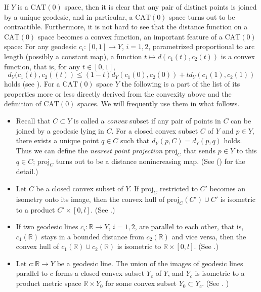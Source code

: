 \documentclass[12pt]{amsart}
\numberwithin{equation}{section}
\theoremstyle{plain}
\theoremstyle{definition}
\theoremstyle{remark}
\newcommand{\R}{{\mathbb R}}
\newcommand{\nrprj}{\mathrm{proj}}
\newcommand{\cat}[1]{\mathrm{CAT}(#1)}
\begin{document}
%
%
If $Y$ is a $\cat{0}$ space, then it is clear that any pair of distinct
points is joined by a unique geodesic, and in particular, a $\cat{0}$
space turns out to be contractible. 
Furthermore, it is not hard to see that the distance function on a
$\cat{0}$ space becomes a convex function, an important feature of a
$\cat{0}$ space: 
For any geodesic $c_i\colon [0,1]\rightarrow Y$, $i=1,2$, parametrized
proportional to arc length (possibly a constant map), a function 
$t \mapsto d(c_1(t),c_2(t))$ is a convex function, that is, for any 
$t \in [0,1]$, 
 \begin{equation*}
  d_Y(c_1(t), c_2((t)) \leq 
   (1-t)d_Y(c_1(0),c_2(0))  + td_Y(c_1(1),c_2(1))
 \end{equation*}
holds (see \cite[p.~176, 2.2 Proposition]{bridson-haefliger}). 
For a $\cat{0}$ space $Y$ the following is a part of the list of its
properties more or less directly derived from the convexity
above and the definition of $\cat{0}$ spaces. 
We will frequently use them in what follows.  
\begin{itemize}
 \item Recall that $C \subset Y$ is called a {\it convex} subset if any
       pair of points in $C$ can be joined by a geodesic lying in $C$.  
       For a closed convex subset $C$ of $Y$ and $p \in Y$, there exists
       a unique point $q \in C$ such that $d_Y(p,C)=d_Y(p,q)$ holds. 
       Thus we can define the {\it nearest point projection} $\nrprj_C$
       that sends $p \in Y$ to this $q \in C$; $\nrprj_C$ turns out to
       be a distance nonincreasing map. 
       (See (\cite[p.~176, 2.4 Proposition]{bridson-haefliger}) for the
       detail.)
 \item Let $C$ be a closed convex subset of $Y$. 
        If $\nrprj_C$ restricted to $C'$ becomes an isometry onto its
       image, then the convex hull of $\nrprj_C(C')\cup C'$ is isometric
       to a product $C' \times [0,l]$. 
       (See \cite[p.~182, 2.12 Exercise (3)]{bridson-haefliger}.)
 \item If two geodesic lines $c_i \colon \R \rightarrow Y$, $i=1,2$,
       are parallel to each other, that is, $c_1(\R)$ stays in a bounded
       distance from $c_2(\R)$ and vice versa, then the convex hull of
       $c_1(\R)\cup c_2(\R)$ is isometric to $\R \times [0,l]$. 
       (See \cite[p.~182, 2.13 The Flat Strip Theorem]{bridson-haefliger}.)
 \item Let $c\colon \R \rightarrow Y$ be a geodesic line. 
       The union of the images of geodesic lines parallel to $c$ forms a
       closed convex subset $Y_c$ of $Y$, and $Y_c$ is isometric to a
       product metric space $\R \times Y_0$ for some convex subset 
       $Y_0 \subset Y_c$. 
       (See \cite[p.~183, 2.14 A Product Decomposition
       Theorem]{bridson-haefliger}. )
\end{itemize}
\end{document}
